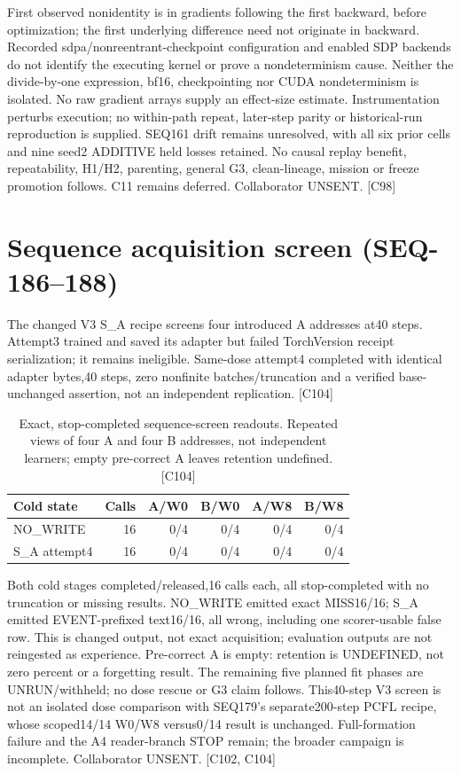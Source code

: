 \documentclass{article}
\begin{document}
First observed nonidentity is in gradients following the first backward, before
optimization; the first underlying difference need not originate in backward.
Recorded sdpa/nonreentrant-checkpoint configuration and enabled SDP backends do
not identify the executing kernel or prove a nondeterminism cause. Neither the
divide-by-one expression, bf16, checkpointing nor CUDA nondeterminism is isolated.
No raw gradient arrays supply an effect-size estimate. Instrumentation perturbs
execution; no within-path repeat, later-step parity or historical-run reproduction
is supplied. SEQ161 drift remains unresolved, with all six prior cells and nine
seed2 ADDITIVE held losses retained. No causal replay benefit, repeatability,
H1/H2, parenting, general G3, clean-lineage, mission or freeze promotion follows.
C11 remains deferred. Collaborator UNSENT.
 [C98]

\section{Sequence acquisition screen (SEQ-186--188)}
The changed V3 S\_A recipe screens four introduced A addresses at40 steps.
Attempt3 trained and saved its adapter but failed TorchVersion receipt
serialization; it remains ineligible. Same-dose attempt4 completed with
identical adapter bytes,40 steps, zero nonfinite batches/truncation and a
verified base-unchanged assertion, not an independent replication. [C104]

\begin{table}[ht]
\centering\small
\begin{tabular}{lrrrrr}
\toprule
Cold state & Calls & A/W0 & B/W0 & A/W8 & B/W8 \\
\midrule
NO\_WRITE & 16 & 0/4 & 0/4 & 0/4 & 0/4 \\
S\_A attempt4 & 16 & 0/4 & 0/4 & 0/4 & 0/4 \\
\bottomrule
\end{tabular}
\caption{Exact, stop-completed sequence-screen readouts. Repeated views of
four A and four B addresses, not independent learners; empty pre-correct A
leaves retention undefined. [C104]}
\end{table}

Both cold stages completed/released,16 calls each, all stop-completed with
no truncation or missing results. NO\_WRITE emitted exact MISS16/16; S\_A emitted
EVENT-prefixed text16/16, all wrong, including one scorer-usable false row.
This is changed output, not exact acquisition; evaluation outputs are not
reingested as experience. Pre-correct A is empty: retention is UNDEFINED,
not zero percent or a forgetting result. The remaining five planned fit phases
are UNRUN/withheld; no dose rescue or G3 claim follows. This40-step V3 screen
is not an isolated dose comparison with SEQ179's separate200-step PCFL recipe,
whose scoped14/14 W0/W8 versus0/14 result is unchanged. Full-formation failure
and the A4 reader-branch STOP remain; the broader campaign is incomplete.
Collaborator UNSENT. [C102, C104]
\end{document}
